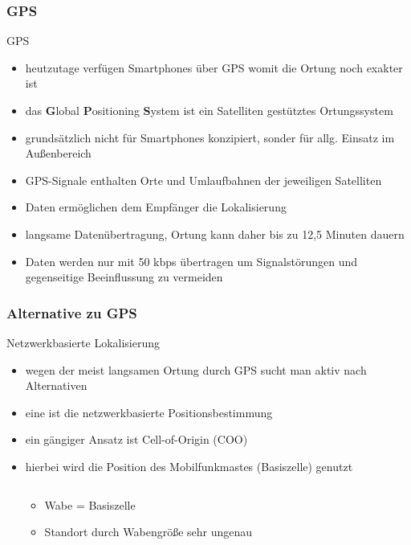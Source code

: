 \subsubsection{GPS}
\begin{frame}{GPS}
\begin{itemize}
  \item heutzutage verfügen Smartphones über GPS womit die Ortung noch exakter ist
  \item das \textbf{G}lobal \textbf{P}ositioning \textbf{S}ystem ist ein Satelliten gestütztes Ortungssystem
  \item grundsätzlich nicht für Smartphones konzipiert, sonder für allg. Einsatz im Außenbereich
  \item GPS-Signale enthalten Orte und Umlaufbahnen der jeweiligen Satelliten
  \item Daten ermöglichen dem Empfänger die Lokalisierung
  \item langsame Datenübertragung, Ortung kann daher bis zu 12,5 Minuten dauern
  \item Daten werden nur mit 50 kbps übertragen um Signalstörungen und gegenseitige Beeinflussung zu vermeiden
\end{itemize}
\end{frame}

\subsubsection{Alternative zu GPS}
\begin{frame}{Netzwerkbasierte Lokalisierung}
\begin{itemize}
  \item wegen der meist langsamen Ortung durch GPS sucht man aktiv nach Alternativen
  \item eine ist die netzwerkbasierte Positionsbestimmung
  \item ein gängiger Ansatz ist Cell-of-Origin (COO)
  \item hierbei wird die Position des Mobilfunkmastes (Basiszelle) genutzt
  \begin{columns}
  \begin{column}{.47\textwidth}
  \begin{itemize}
  \vspace{-2cm}
  \normalsize \item Wabe = Basiszelle
  \item Standort durch Wabengröße sehr ungenau 
  \end{itemize}
  \end{column}
  \begin{column}{.45\textwidth}
  \begin{center}
  \vspace{-0.5cm}
  \end{center}
  \end{column}
  \end{columns}
\end{itemize}
\end{frame}

